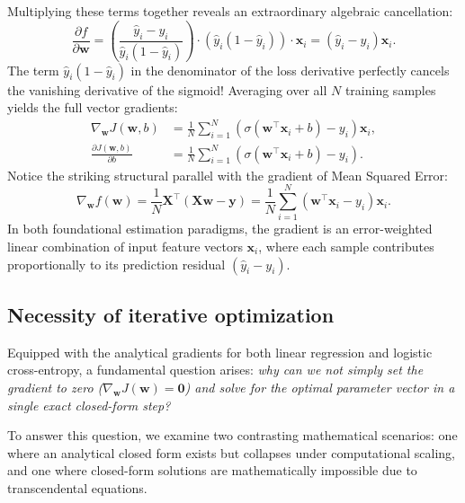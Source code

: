 Multiplying these terms together reveals an extraordinary algebraic cancellation:
\begin{equation}
\frac{\partial f}{\partial \mathbf{w}} = \left( \frac{\hat{y}_i - y_i}{\hat{y}_i(1 - \hat{y}_i)} \right) \cdot \left( \hat{y}_i(1 - \hat{y}_i) \right) \cdot \mathbf{x}_i = (\hat{y}_i - y_i) \mathbf{x}_i.
\label{eq:bce_single_sample_gradient}
\end{equation}
The term $\hat{y}_i(1 - \hat{y}_i)$ in the denominator of the loss derivative perfectly cancels the vanishing derivative of the sigmoid! Averaging over all $N$ training samples yields the full vector gradients:
\begin{align}
\nabla_{\mathbf{w}} J(\mathbf{w}, b) &= \frac{1}{N} \sum_{i=1}^N \left( \sigma(\mathbf{w}^\top \mathbf{x}_i + b) - y_i \right) \mathbf{x}_i, \label{eq:bce_gradient_w} \\
\frac{\partial J(\mathbf{w}, b)}{\partial b} &= \frac{1}{N} \sum_{i=1}^N \left( \sigma(\mathbf{w}^\top \mathbf{x}_i + b) - y_i \right). \label{eq:bce_gradient_b}
\end{align}
Notice the striking structural parallel with the gradient of Mean Squared Error:
\begin{equation}
\nabla_\mathbf{w} f(\mathbf{w}) = \frac{1}{N} \mathbf{X}^\top (\mathbf{X}\mathbf{w} - \mathbf{y}) = \frac{1}{N} \sum_{i=1}^N (\mathbf{w}^\top \mathbf{x}_i - y_i) \mathbf{x}_i.
\label{eq:mse_gradient_exact}
\end{equation}
In both foundational estimation paradigms, the gradient is an error-weighted linear combination of input feature vectors $\mathbf{x}_i$, where each sample contributes proportionally to its prediction residual $(\hat{y}_i - y_i)$.

\subsection{Necessity of iterative optimization}
\label{sec:no_closed_form_solution}

Equipped with the analytical gradients for both linear regression and logistic cross-entropy, a fundamental question arises: \textit{why can we not simply set the gradient to zero ($\nabla_\mathbf{w} J(\mathbf{w}) = \mathbf{0}$) and solve for the optimal parameter vector in a single exact closed-form step?}

To answer this question, we examine two contrasting mathematical scenarios: one where an analytical closed form exists but collapses under computational scaling, and one where closed-form solutions are mathematically impossible due to transcendental equations.

